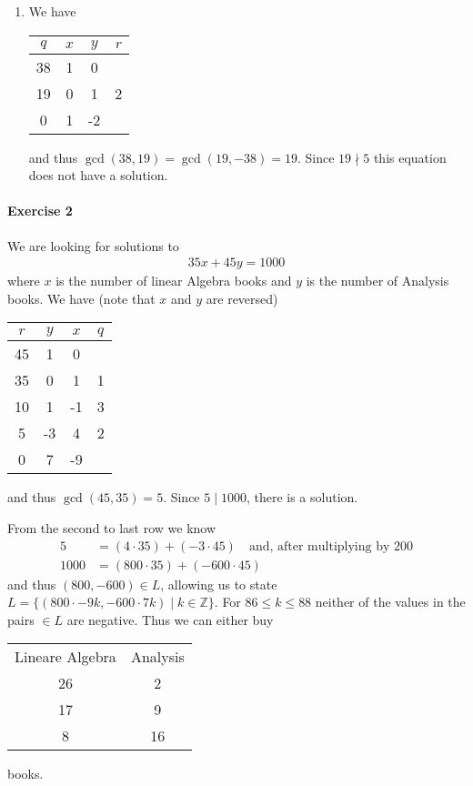 \documentclass{article}
\begin{document}
\begin{enumerate}
    \item We have
    \begin{center}
        \begin{tabular}{c | c c | c}
            $q$ & $x$ & $y$ & $r$ \\\midrule
            38 & 1 & 0 & \\
            19 & 0 & 1 & 2 \\
            0 & 1 & -2 &  \\
        \end{tabular}
    \end{center}
    and thus $\gcd(38, 19) = \gcd(19, -38) = 19$. Since $19 \nmid 5$ this equation does not have a solution.
\end{enumerate}

\pagebreak
\paragraph{Exercise 2}

We are looking for solutions to
\begin{align*}
    35x + 45y = 1000
\end{align*}
where $x$ is the number of linear Algebra books and $y$ is the number of Analysis books. We have (note that $x$ and $y$ are reversed)
\begin{center}
    \begin{tabular}{c | c c | c}
        $r$ & $y$ & $x$ & $q$ \\\midrule
        45 & 1 & 0 & \\
        35 & 0 & 1 & 1 \\
        10 & 1 & -1 & 3 \\ 
        5 & -3 & 4 & 2 \\ 
        0 & 7 & -9 & \\ 
    \end{tabular}
\end{center}
and thus $\gcd(45, 35) = 5$. Since $5 \mid 1000$, there is a solution.

From the second to last row we know
\begin{align*}
    5  &=  (4 \cdot 35) + (-3 \cdot 45) \quad \text{and, after multiplying by 200}\\
    1000 &=  (800 \cdot 35) + (-600 \cdot 45)
\end{align*}
and thus $(800, -600) \in L$, allowing us to state $L = \{(800 \cdot -9k, -600 \cdot 7k) \mid k \in \mathbb{Z}\}$. For $86 \leq k \leq 88$ neither of the values in the pairs $\in L$ are negative. Thus we can either buy 
\begin{center}
    \begin{tabular}{c c}
        Lineare Algebra & Analysis \\
        26 & 2 \\
        17 & 9 \\
        8 & 16 \\
    \end{tabular}
\end{center}
books.
\end{document}
